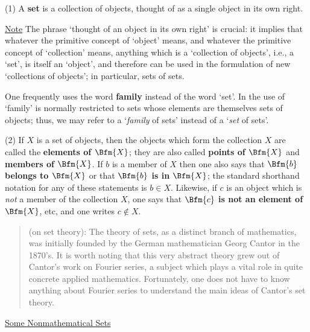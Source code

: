 \hspace*{\parindent}(1) A {\bf set} is a collection of objects, thought of as a single object in its own right.

        \underline{Note} The phrase `thought of an object in its own right' is crucial:
    it implies that whatever the primitive concept of `object' means, and whatever the primitive concept of `collection' means,
    anything which is a `collection of objects', i.e., a `set', is itself an `object',
    and therefore can be used in the formulation of new `collections of objects'; in particular, sets of sets.

        One frequently uses the word {\bf family} instead of the word `set'.
     In {\TheseNotes} the use of `family' is normally restricted to sets whose elements are themselves sets of objects;
    thus, we may refer to a `{\em family} of sets' instead of a `{\em set} of sets'.

\V

        (2) If $X$ is a set of objects, then the objects which form the collection $X$ are called the
    {\bf elements of $\Bfm{X}$}; they are also called {\bf points of $\Bfm{X}$} and {\bf members of $\Bfm{X}$}.
    If $b$ is a member of $X$ then one also says that {\bf $\Bfm{b}$ belongs to $\Bfm{X}$} or that {\bf $\Bfm{b}$ is in $\Bfm{X}$};
    the standard shorthand notation for any of these statements is $b{\in}X$.
    Likewise, if $c$ is an object which is {\em not} a member of the collection $X$,
    one says that {\bf $\Bfm{c}$ is not an element of $\Bfm{X}$}, etc, and one writes $c\not\in X$.

\V
\V

\begin{quotation}
{\footnotesize \underline{\Note} (on set theory): The theory of sets, as a distinct branch of mathematics, was initially founded by the German mathematician Georg Cantor in the 1870's.
    It is worth noting that this very abstract theory grew out of Cantor's work on Fourier series,
    a subject which plays a vital role in quite concrete applied mathematics.
    Fortunately, one does not have to know anything about Fourier series to understand the main ideas of Cantor's set theory.
}%
\end{quotation} 

\V
\V

        \underline{Some Nonmathematical Sets}

